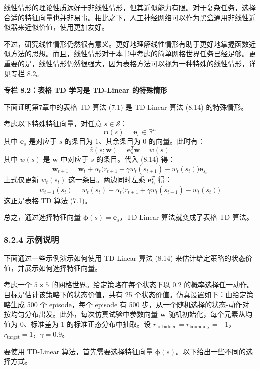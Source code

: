 \documentclass[UTF8]{article}
\begin{document}
线性情形的理论性质远好于非线性情形，但其近似能力有限。对于复杂任务，选择合适的特征向量也并非易事。相比之下，人工神经网络可以作为黑盒通用非线性近似器来近似价值，使用更加友好。

不过，研究线性情形仍然很有意义。更好地理解线性情形有助于更好地掌握函数近似方法的思想。而且，线性情形对于本书中考虑的简单网格世界任务已经足够。更重要的是，线性情形仍然很强大，因为表格方法可以视为一种特殊的线性情形，详见专栏 8.2。

\begin{proofbox}
\textbf{专栏 8.2：表格 TD 学习是 TD-Linear 的特殊情形}

下面证明第7章中的表格 TD 算法 (7.1) 是 TD-Linear 算法 (8.14) 的特殊情形。

考虑以下特殊特征向量，对任意 $s \in \mathcal{S}$：
\[
\boldsymbol{\phi}(s) = \boldsymbol{e}_s \in \mathbb{R}^n
\]
其中 $\boldsymbol{e}_s$ 是对应于 $s$ 的条目为 $1$、其余条目为 $0$ 的向量。此时有：
\[
\hat{v}(s; \boldsymbol{w}) = \boldsymbol{e}_s^T \boldsymbol{w} = w(s)
\]
其中 $w(s)$ 是 $\boldsymbol{w}$ 中对应于 $s$ 的条目。代入 (8.14) 得：
\[
\boldsymbol{w}_{t+1} = \boldsymbol{w}_t + \alpha_t \big(r_{t+1} + \gamma w_t(s_{t+1}) - w_t(s_t)\big) \boldsymbol{e}_{s_t}
\]
上式仅更新 $w_t(s_t)$ 这一条目。两边同时左乘 $\boldsymbol{e}_{s_t}^T$ 得：
\[
w_{t+1}(s_t) = w_t(s_t) + \alpha_t \big(r_{t+1} + \gamma w_t(s_{t+1}) - w_t(s_t)\big)
\]
这正是表格 TD 算法 (7.1)。

总之，通过选择特征向量 $\boldsymbol{\phi}(s) = \boldsymbol{e}_s$，TD-Linear 算法就变成了表格 TD 算法。
\end{proofbox}

\subsubsection*{8.2.4 示例说明}

下面通过一些示例演示如何使用 TD-Linear 算法 (8.14) 来估计给定策略的状态价值，并展示如何选择特征向量。

考虑一个 $5 \times 5$ 的网格世界。给定策略在每个状态下以 $0.2$ 的概率选择任一动作。目标是估计该策略下的状态价值，共有 25 个状态价值。仿真设置如下：由给定策略生成 500 个 episode，每个 episode 有 500 步，从一个随机选择的状态-动作对按均匀分布出发。此外，每次仿真试验中参数向量 $\boldsymbol{w}$ 随机初始化，每个元素从均值为 $0$、标准差为 $1$ 的标准正态分布中抽取。设 $r_{\text{forbidden}} = r_{\text{boundary}} = -1$，$r_{\text{target}} = 1$，$\gamma = 0.9$。

要使用 TD-Linear 算法，首先需要选择特征向量 $\boldsymbol{\phi}(s)$。以下给出一些不同的选择方式。
\end{document}
